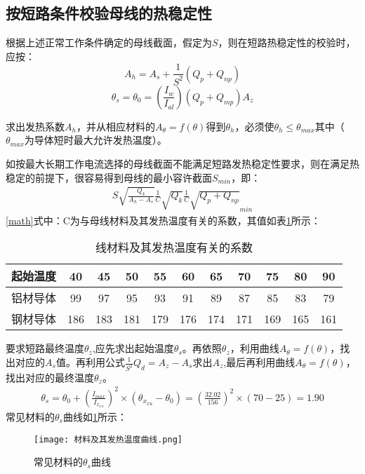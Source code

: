 \subsection{按短路条件校验母线的热稳定性}
根据上述正常工作条件确定的母线截面，假定为$S$，则在短路热稳定性的校验时，应按：
$$
A_h=A_s+\frac{1}{S^2}(Q_p+Q_{np})
$$
$$
\theta _s=\theta _0=(\frac{I_w}{I_{al}})(Q_p+Q_{mp})A_z
$$

求出发热系数$A_h$，并从相应材料的$A_\theta=f(\theta)$得到$\theta_h$，必须使$\theta_h≤\theta_{max}$其中（$\theta_{max}$为导体短时最大允许发热温度）。

如按最大长期工作电流选择的母线截面不能满足短路发热稳定性要求，则在满足热稳定的前提下，很容易得到母线的最小容许截面$S_{min}$，即：
\begin{align}
	S\sqrt{\frac{Q_k}{A_h-A_s}}\frac{1}{C}\sqrt{Q_k}\frac{1}{C}\sqrt{Q_p+Q_{np}}_{min}\label{math}
\end{align}
\ref{math}式中：C为与母线材料及其发热温度有关的系数，其值如表\ref{tab:线材料及其发热温度有关的系数}所示：
\begin{table}[h]
	\centering
	\renewcommand\arraystretch{2}
	\caption{线材料及其发热温度有关的系数}
	\label{tab:线材料及其发热温度有关的系数}
	\begin{tabular}{ccccccccccc}
		\hline
		起始温度 & 40  & 45  & 50  & 55  & 60  & 65  & 70  & 75  & 80  & 90  \\ \hline
		铝材导体 & 99  & 97  & 95  & 93  & 91  & 89  & 87  & 85  & 83  & 79  \\ \hline
		钢材导体 & 186 & 183 & 181 & 179 & 176 & 174 & 171 & 169 & 165 & 161 \\ \hline
	\end{tabular}
\end{table}
要求短路最终温度$\theta_z$,应先求出起始温度$\theta_s$。再依照$\theta_z$，利用曲线$A_\theta =f(\theta)$，找出对应的$A_s$值。再利用公式$\frac{1}{S^2}Q_d=A_z-A_s$求出$A_z$,最后再利用曲线$A_\theta =f(\theta)$，找出对应的最终温度$\theta_z$。
\begin{align}
\theta _s=\theta _0+\left( \frac{I_{max}}{I_{x_{xu}}} \right) ^2\times (\theta _{x_{xu}}-\theta _0)=\left( \frac{32.02}{156} \right) ^2\times \left( 70-25 \right) =1.90\label{key}
\end{align}
常见材料的$\theta_s$曲线如\ref{材料及其发热温度曲线}所示：
\begin{figure}[h]
	\centering
	\texttt{[image: 材料及其发热温度曲线.png]}
	\caption{常见材料的$\theta_s$曲线}
	\label{材料及其发热温度曲线}
\end{figure}

